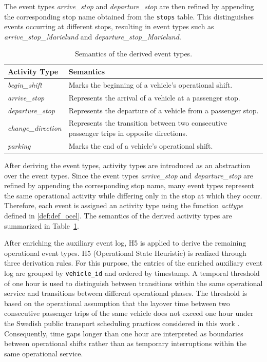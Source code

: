 The event types \textit{arrive\_stop} and \textit{departure\_stop} are then refined by appending the corresponding stop name obtained from the \texttt{stops} table. This distinguishes events occurring at different stops, resulting in event types such as \textit{arrive\_stop\_Marielund} and \textit{departure\_stop\_Marielund}.
\begin{table}[ht]
\centering
\caption{Semantics of the derived event types.}
\label{tab:event_semantics}
\renewcommand{\arraystretch}{1.2}
\begin{tabular}{p{3.2cm} p{10.5cm}}
\toprule
\textbf{Activity Type} & \textbf{Semantics} \\
\midrule
\textit{begin\_shift} &
Marks the beginning of a vehicle's operational shift. \\

\textit{arrive\_stop} &
Represents the arrival of a vehicle at a passenger stop. \\

\textit{departure\_stop} &
Represents the departure of a vehicle from a passenger stop. \\

\textit{change\_direction} &
Represents the transition between two consecutive passenger trips in opposite directions. \\

\textit{parking} &
Marks the end of a vehicle's operational shift. \\
\bottomrule
\end{tabular}
\end{table}
After deriving the event types, activity types are introduced as an abstraction over the event types. Since the event types \textit{arrive\_stop} and \textit{departure\_stop} are refined by appending the corresponding stop name, many event types represent the same operational activity while differing only in the stop at which they occur. Therefore, each event is assigned an activity type using the function \textit{acttype} defined in \autoref{def:def_ocel}. The semantics of the derived activity types are summarized in Table~\ref{tab:event_semantics}.

After enriching the auxiliary event log, H5 is applied to derive the remaining operational event types. H5 (Operational State Heuristic) is realized through three derivation rules. For this purpose, the entries of the enriched auxiliary event log are grouped by \texttt{vehicle\_id} and ordered by timestamp.  A temporal threshold of one hour is used to distinguish between transitions within the same operational service and transitions between different operational phases. The threshold is based on the operational assumption that the layover time between two consecutive passenger trips of the same vehicle does not exceed one hour under the Swedish public transport scheduling practices considered in this work \cite{european_commission_driving_time_rest_periods}. Consequently, time gaps longer than one hour are interpreted as boundaries between operational shifts rather than as temporary interruptions within the same operational service.

